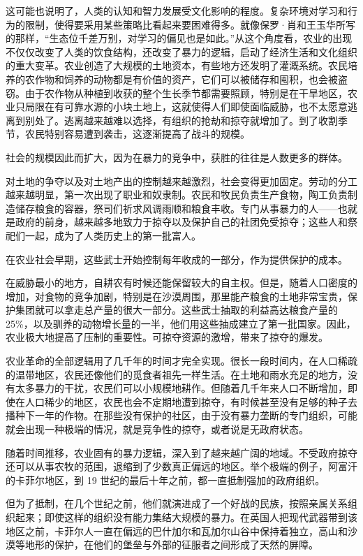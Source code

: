 这可能也说明了，人类的认知和智力发展受文化影响的程度。复杂环境对学习和行为的限制，使得要采用某些策略比看起来要困难得多。就像保罗·肖和王玉华所写的那样，“生态位千差万别，对学习的偏见也是如此。”从这个角度看，农业的出现不仅仅改变了人类的饮食结构，还改变了暴力的逻辑，启动了经济生活和文化组织的重大变革。农业创造了大规模的土地资本，有些地方还发明了灌溉系统。农民培养的农作物和饲养的动物都是有价值的资产，它们可以被储存和囤积，也会被盗窃。由于农作物从种植到收获的整个生长季节都需要照顾，特别是在干旱地区，农业只局限在有可靠水源的小块土地上，这就使得人们即使面临威胁，也不太愿意逃离到别处了。逃离越来越难以选择，有组织的抢劫和掠夺就增加了。到了收割季节，农民特别容易遭到袭击，这逐渐提高了战斗的规模。

社会的规模因此而扩大，因为在暴力的竞争中，获胜的往往是人数更多的群体。

对土地的争夺以及对土地产出的控制越来越激烈，社会变得更加固定。劳动的分工越来越明显，第一次出现了职业和奴隶制。农民和牧民负责生产食物，陶工负责制造储存粮食的容器，祭司们祈求风调雨顺和粮食丰收。专门从事暴力的人——也就是政府的前身，越来越多地致力于掠夺以及保护自己的社团免受掠夺；这些人和祭祀们一起，成为了人类历史上的第一批富人。

在农业社会早期，这些武士开始控制每年收成的一部分，作为提供保护的成本。

在威胁最小的地方，自耕农有时候还能保留较大的自主权。但是，随着人口密度的增加，对食物的竞争加剧，特别是在沙漠周围，那里能产粮食的土地非常宝贵，保护集团就可以拿走总产量的很大一部分。这些武士抽取的利益高达粮食产量的25\%，以及驯养的动物增长量的一半，他们用这些抽成建立了第一批国家。因此，农业极大地提高了压制的重要性。可掠夺资源的激增，带来了掠夺的爆发。

农业革命的全部逻辑用了几千年的时间才完全实现。很长一段时间内，在人口稀疏的温带地区，农民还像他们的觅食者祖先一样生活。在土地和雨水充足的地方，没有太多暴力的干扰，农民们可以小规模地耕作。但随着几千年来人口不断增加，即使在人口稀少的地区，农民也会不定期地遭到掠夺，有时候甚至没有足够的种子去播种下一年的作物。在那些没有保护的社区，由于没有暴力垄断的专门组织，可能就会出现一种极端的情况，就是竞争性的掠夺，或者说是无政府状态。

随着时间推移，农业固有的暴力逻辑，深入到了越来越广阔的地域。不受政府掠夺还可以从事农牧的范围，退缩到了少数真正偏远的地区。举个极端的例子，阿富汗的卡菲尔地区，到 19 世纪的最后十年之前，都一直抵制强加的政府组织。

但为了抵制，在几个世纪之前，他们就演进成了一个好战的民族，按照亲属关系组织起来；即使这样的组织没有能力集结大规模的暴力。在英国人把现代武器带到该地区之前，卡菲尔人一直在偏远的巴什加尔和瓦加尔山谷中保持着独立，高山和沙漠等地形的保护，在他们的堡垒与外部的征服者之间形成了天然的屏障。


